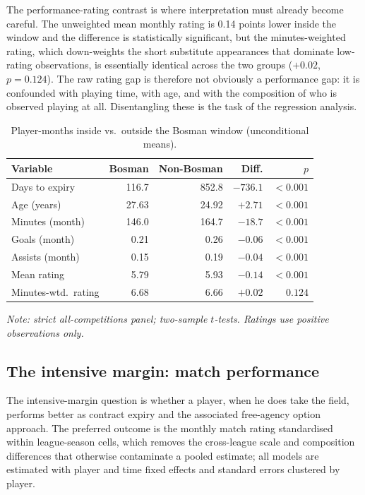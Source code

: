 The performance-rating contrast is where interpretation must already become
careful. The unweighted mean monthly rating is 0.14 points lower inside the
window and the difference is statistically significant, but the minutes-weighted
rating, which down-weights the short substitute appearances that dominate
low-rating observations, is essentially identical across the two groups
($+0.02$, $p = 0.124$). The raw rating gap is therefore not obviously a
performance gap: it is confounded with playing time, with age, and with the
composition of who is observed playing at all. Disentangling these is the task
of the regression analysis.

\begin{table}[htbp]
  \centering
  \caption{Player-months inside vs.\ outside the Bosman window (unconditional means).}
  \label{tab:bosman-means}
  \begin{tabular}{lrrrr}
    \toprule
    Variable & Bosman & Non-Bosman & Diff. & $p$ \\
    \midrule
    Days to expiry        & 116.7 & 852.8 & $-736.1$ & ${<}0.001$ \\
    Age (years)           & 27.63 & 24.92 & $+2.71$  & ${<}0.001$ \\
    Minutes (month)       & 146.0 & 164.7 & $-18.7$  & ${<}0.001$ \\
    Goals (month)         & 0.21  & 0.26  & $-0.06$  & ${<}0.001$ \\
    Assists (month)       & 0.15  & 0.19  & $-0.04$  & ${<}0.001$ \\
    Mean rating           & 5.79  & 5.93  & $-0.14$  & ${<}0.001$ \\
    Minutes-wtd.\ rating  & 6.68  & 6.66  & $+0.02$  & $0.124$    \\
    \bottomrule
  \end{tabular}

  \vspace{4pt}
  {\footnotesize\itshape Note: strict all-competitions panel; two-sample
  $t$-tests. Ratings use positive observations only.\par}
\end{table}

\subsection{The intensive margin: match performance}
\label{sec:results-intensive}

The intensive-margin question is whether a player, when he does take the field,
performs better as contract expiry and the associated free-agency option
approach. The preferred outcome is the monthly match rating standardised within
league-season cells, which removes the cross-league scale and composition
differences that otherwise contaminate a pooled estimate; all models are
estimated with player and time fixed effects and standard errors clustered by
player.


